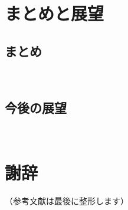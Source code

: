 \documentclass[12pt,a4j]{jreport}
\begin{document}





\chapter{まとめと展望}


\section{まとめ}
~

\section{今後の展望}
~%
~

\chapter*{謝辞}

（参考文献は最後に整形します）



\end{document}
